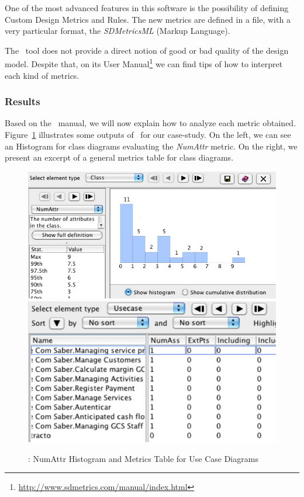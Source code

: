 One of the most advanced features in this software is the possibility of defining Custom Design Metrics and Rules. 
The new metrics are defined in a \xml file, with a very particular format, the \emph{SDMetricsML} (\sdmetrics Markup Language).

The \sdmetrics\ tool does not provide a direct notion of good or bad quality of the design model. 
Despite that, on its User Manual\footnote{\url{http://www.sdmetrics.com/manual/index.html}} we can find tips of how to interpret each kind of metrics. 
 
\subsubsection{Results}
Based on the \sdmetrics\ manual, we will now explain how to analyze each metric obtained. 
Figure~\ref{fig:sdmetrics} illustrates some outputs of \sdmetrics\ for our case-study. 
On the left, we can see an Histogram for class diagrams evaluating the \emph{NumAttr} metric. On the right, we present an excerpt of a general metrics table for class diagrams.

\begin{figure}[htbp]
\includegraphics[scale=0.3]{images/histogram2}
\hspace{0.1cm}
\includegraphics[scale=0.32]{images/table3}
\caption{\sdmetrics: \textsf{NumAttr} Histogram and Metrics Table for Use Case Diagrams}
\label{fig:sdmetrics}
\end{figure}


